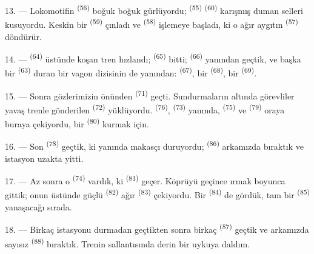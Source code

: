 13. --- Lokomotifin  \textsuperscript{(56)} boğuk boğuk
gürlüyordu;  \textsuperscript{(55)} 
\textsuperscript{(60)} karışmış duman selleri kusuyordu. Keskin bir
 \textsuperscript{(59)} çınladı ve 
\textsuperscript{(58)} işlemeye başladı, ki o ağır aygıtın
 \textsuperscript{(57)} döndürür.

\VUsaut{3.0mm}
\VUsaut{3.0mm}

14. ---  \textsuperscript{(64)} üstünde koşan tren hızlandı;
 \textsuperscript{(65)} bitti; 
\textsuperscript{(66)} yanından geçtik, ve başka bir 
\textsuperscript{(63)} duran bir vagon dizisinin de yanından:
 \textsuperscript{(67)}, bir 
\textsuperscript{(68)}, bir  \textsuperscript{(69)}.


15. --- Sonra gözlerimizin önünden 
\textsuperscript{(71)} geçti. Sundurmaların altında görevliler yavaş trenle
gönderilen  \textsuperscript{(72)} yüklüyordu.  \textsuperscript{(76)}, 
\textsuperscript{(73)} yanında, 
\textsuperscript{(75)} ve  \textsuperscript{(79)} oraya
buraya çekiyordu, bir  \textsuperscript{(80)} kurmak için.

16. --- Son  \textsuperscript{(78)} geçtik, ki yanında makasçı
duruyordu;  \textsuperscript{(86)} arkamızda
bıraktık ve istasyon uzakta yitti.

17. --- Az sonra o  \textsuperscript{(74)} vardık, ki
 \textsuperscript{(81)} geçer. Köprüyü geçince ırmak boyunca gittik;
onun üstünde güçlü  \textsuperscript{(82)} ağır
 \textsuperscript{(83)} çekiyordu. Bir
 \textsuperscript{(84)} de gördük, tam bir  \textsuperscript{(85)} yanaşacağı sırada.

18. --- Birkaç istasyonu durmadan geçtikten sonra birkaç 
\textsuperscript{(87)} geçtik ve arkamızda sayısız 
 \textsuperscript{(88)} bıraktık. Trenin sallantısında derin
bir uykuya daldım.

